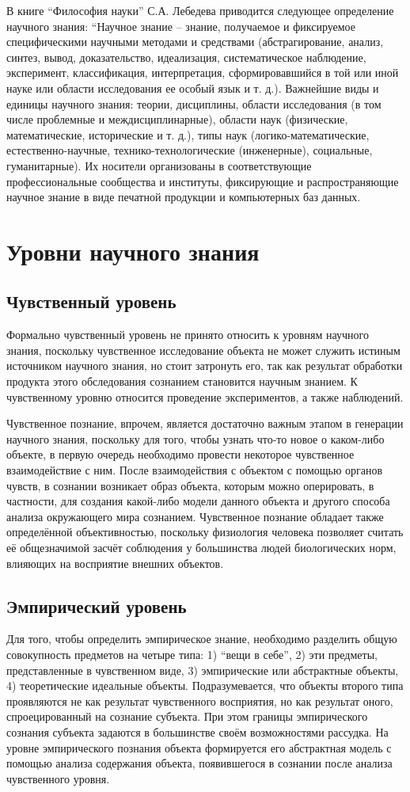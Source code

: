 \documentclass[14pt]{article}
\begin{document}
В книге ``Философия науки'' С.А. Лебедева приводится следующее определение научного знания: ``Научное знание -- знание, получаемое и фиксируемое специфическими научными методами и средствами (абстра­гирование, анализ, синтез, вывод, доказательство, идеализация, систематическое наблюдение, эксперимент, классификация, интерпретация, сформировавшийся в той или иной науке или области исследования ее особый язык и т. д.). Важнейшие виды и единицы научного знания: теории, дисциплины, области исследования (в том числе проблемные и междисциплинарные), области наук (физические, математические, исторические и т. д.), типы наук (логико-математические, естественно-научные, технико-технологические (инженерные), социальные, гуманитарные). Их носители организованы в соответствующие профессиональные сообщества и институты, фиксирующие и распространяющие научное знание в виде печатной продукции и компьютерных баз данных.
 \section{Уровни научного знания}
 \subsection{Чувственный уровень}
Формально чувственный уровень не принято относить к уровням научного знания, поскольку чувственное исследование объекта не может служить истиным источником научного знания, но стоит затронуть его, так как результат обработки продукта этого обследования сознанием становится научным знанием. К чувственному уровню относится проведение экспериментов, а также наблюдений. 

Чувственное познание, впрочем, является достаточно важным этапом в генерации научного знания, поскольку для того, чтобы узнать что-то новое о каком-либо объекте, в первую очередь необходимо провести некоторое чувственное взаимодействие с ним. После взаимодействия с объектом с помощью органов чувств, в сознании возникает образ объекта, которым можно оперировать, в частности, для создания какой-либо модели данного объекта и другого способа анализа окружающего мира сознанием. Чувственное познание обладает также определённой объективностью, поскольку физиология человека позволяет считать её общезначимой засчёт соблюдения у большинства людей биологических норм, влияющих на восприятие внешних объектов.
\subsection{Эмпирический уровень}
Для того, чтобы определить эмпирическое знание, необходимо разделить общую совокупность предметов на четыре типа: 1) ``вещи в себе'', 2) эти предметы, представленные в чувственном виде, 3) эмпирические или абстрактные объекты, 4) теоретические идеальные объекты. Подразумевается, что объекты второго типа проявляются не как результат чувственного восприятия, но как результат оного, спроецированный на сознание субъекта. При этом границы эмпирического сознания субъекта задаются в большинстве своём возможностями рассудка. На уровне эмпирического познания объекта формируется его абстрактная модель с помощью анализа содержания объекта, появившегося в сознании после анализа чувственного уровня.
\end{document}
